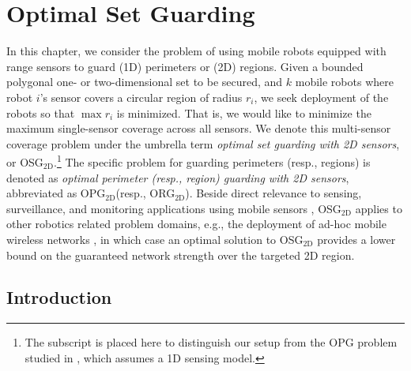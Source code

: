 
\chapter{Optimal Set Guarding}
\thispagestyle{myheadings}

\def\R{\mathbf{R}}
\def\C{\mathcal C}
\def\W{\mathcal W}

\def\opt{\textsc{OPT}\xspace}

\def\osgt{\textsc{OSG${}_{\mathrm{2D}}$}\xspace}

\def\opg{\textsc{OPG}\xspace}
\def\opgt{\textsc{OPG${}_{\mathrm{2D}}$}\xspace}
\def\orgt{\textsc{{ORG}${}_{\mathrm{2D}}$}\xspace}
\def\dopgt{\textsc{{D-OPG}${}_{\mathrm{2D}}$}\xspace}
\def\dorgt{\textsc{{D-ORG}${}_{\mathrm{2D}}$}\xspace}


In this chapter, we consider the problem of using mobile robots equipped 
with range sensors to guard (1D) perimeters or (2D) regions. Given 
a bounded polygonal one- or two-dimensional set to be secured, 
and $k$ mobile robots where robot $i$'s sensor covers a circular region of 
radius $r_i$, we seek deployment of the robots so that $\max r_i$ is 
minimized. That is, we would like to minimize the maximum single-sensor 
coverage across all sensors. We denote this multi-sensor coverage problem 
under the umbrella term {\em optimal set guarding with 2D sensors}, or 
\osgt.\footnote{The subscript is placed here to distinguish our setup 
from the \opg problem studied in \cite{fenghangaoyu2019efficient}, which assumes 
a 1D sensing model.} The specific problem for guarding
perimeters (resp., regions) is denoted as {\em optimal perimeter 
(resp., region) guarding with 2D sensors}, abbreviated as \opgt (resp., 
\orgt). Beside direct relevance to sensing, surveillance, and monitoring 
applications using mobile sensors \cite{batalin2002spreading,
cortes2004coverage,fenghangaoyu2019efficient}, \osgt applies to other robotics
related problem domains, e.g., the deployment of ad-hoc mobile wireless 
networks \cite{correll2009ad,gil2012communication}, in which case an 
optimal solution to \osgt provides a lower bound on the guaranteed network 
strength over the targeted 2D region. 

\section{Introduction}\label{sec:osg-intro}


